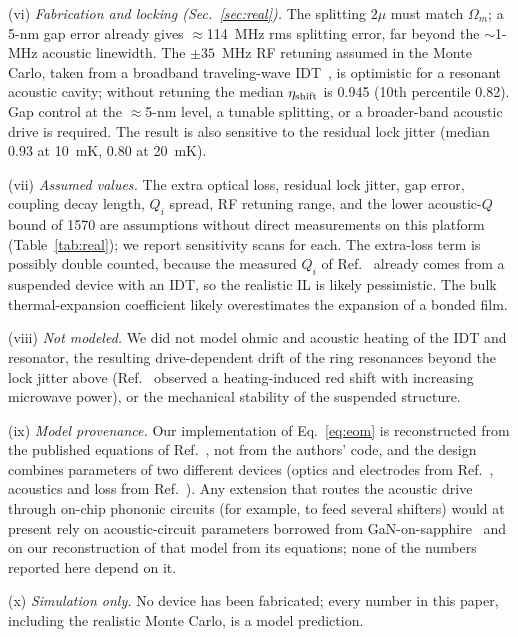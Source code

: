 \documentclass[aps,prapplied,reprint,superscriptaddress,amsmath,amssymb,floatfix]{revtex4-2}
\newcommand{\etash}{\eta_{\rm shift}}
\begin{document}
(vi) \emph{Fabrication and locking (Sec.~\ref{sec:real}).} The splitting $2\mu$ must match $\Omega_m$; a 5-nm gap error already gives $\approx$114~MHz rms splitting error, far beyond the $\sim$1-MHz acoustic linewidth. The $\pm35$~MHz RF retuning assumed in the Monte Carlo, taken from a broadband traveling-wave IDT~\cite{Shao2020}, is optimistic for a resonant acoustic cavity; without retuning the median $\etash$ is 0.945 (10th percentile 0.82). Gap control at the $\approx$5-nm level, a tunable splitting, or a broader-band acoustic drive is required. The result is also sensitive to the residual lock jitter (median 0.93 at 10~mK, 0.80 at 20~mK).

(vii) \emph{Assumed values.} The extra optical loss, residual lock jitter, gap error, coupling decay length, $Q_i$ spread, RF retuning range, and the lower acoustic-$Q$ bound of 1570 are assumptions without direct measurements on this platform (Table~\ref{tab:real}); we report sensitivity scans for each. The extra-loss term is possibly double counted, because the measured $Q_i$ of Ref.~\cite{Shao2019} already comes from a suspended device with an IDT, so the realistic IL is likely pessimistic. The bulk thermal-expansion coefficient likely overestimates the expansion of a bonded film.

(viii) \emph{Not modeled.} We did not model ohmic and acoustic heating of the IDT and resonator, the resulting drive-dependent drift of the ring resonances beyond the lock jitter above (Ref.~\cite{Shao2019} observed a heating-induced red shift with increasing microwave power), or the mechanical stability of the suspended structure.

(ix) \emph{Model provenance.} Our implementation of Eq.~\eqref{eq:eom} is reconstructed from the published equations of Ref.~\cite{Hu2021}, not from the authors' code, and the design combines parameters of two different devices (optics and electrodes from Ref.~\cite{Hu2021}, acoustics and loss from Ref.~\cite{Shao2019}). Any extension that routes the acoustic drive through on-chip phononic circuits (for example, to feed several shifters) would at present rely on acoustic-circuit parameters borrowed from GaN-on-sapphire~\cite{Xu2025} and on our reconstruction of that model from its equations; none of the numbers reported here depend on it.

(x) \emph{Simulation only.} No device has been fabricated; every number in this paper, including the realistic Monte Carlo, is a model prediction.

\end{document}
